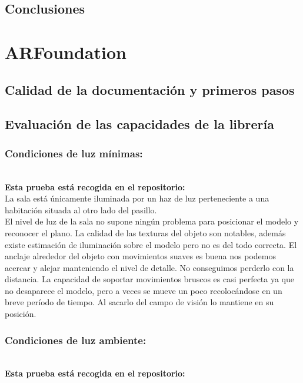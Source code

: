 \subsection{Conclusiones}

\clearpage
\section{ARFoundation}
\subsection{Calidad de la documentación y primeros pasos}

\subsection{Evaluación de las capacidades de la librería}
\subsubsection{Condiciones de luz mínimas:}\\
\textbf{Esta prueba está recogida en el repositorio:}\\
La sala está únicamente iluminada por un haz de luz perteneciente a una habitación situada al otro lado del pasillo.\\

El nivel de luz de la sala no supone ningún problema para posicionar el modelo y reconocer el plano. La calidad de las texturas del objeto son notables, además existe estimación de iluminación sobre el modelo pero no es del todo correcta. El anclaje alrededor del objeto con movimientos suaves es buena nos podemos acercar y alejar manteniendo el nivel de detalle. No conseguimos perderlo con la distancia. La capacidad de soportar movimientos bruscos es casi perfecta ya que no desaparece el modelo, pero a veces se mueve un poco recolocándose en un breve período de tiempo. Al sacarlo del campo de visión lo mantiene en su posición.

\subsubsection{Condiciones de luz ambiente:}\\
\textbf{Esta prueba está recogida en el repositorio:}\\


